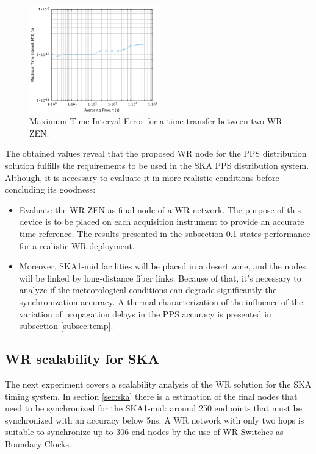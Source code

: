 \begin{figure}
		\centering
		\includegraphics[width=0.5\textwidth]{img/MTIE_exp1}
		\caption[MTIE plot for the WR-ZEN]{Maximum Time Interval Error for a 
		time transfer between two WR-ZEN.}
		\label{fig:mtie_exp1}

\end{figure}

The obtained values reveal that the proposed WR node for the PPS distribution 
solution fulfills the requirements to be used in the SKA PPS distribution 
system. Although, it is necessary to evaluate it in more realistic conditions 
before concluding its goodness:

\begin{itemize}
	\item Evaluate the WR-ZEN as final node of a WR network. The purpose of 
	this device is to be placed on each acquisition instrument to provide an 
	accurate time reference. The results presented in the subsection 
	\ref{subsec: net_exp} states performance for a realistic WR deployment.
	
	\item Moreover, SKA1-mid facilities will be placed in a desert zone, and 
	the nodes will be linked by long-distance fiber links. Because of that, 
	it's 
	necessary to analyze if the meteorological conditions can degrade 
	significantly the synchronization accuracy. A thermal characterization of 
	the influence of the variation of propagation delays in the PPS accuracy is 
	presented in subsection \ref{subsec:temp}.
\end{itemize}   

\subsection{WR scalability for SKA} %
\label{subsec: net_exp}

The next experiment covers a scalability analysis of the WR solution for the 
SKA timing system. In section \ref{sec:ska} there is a estimation of the final 
nodes that need to be synchronized for the SKA1-mid: around 250 endpoints that 
must be synchronized with an accuracy below 5ns. A WR network with only two 
hops is suitable to synchronize up to 306 end-nodes by the use of WR Switches as 
Boundary Clocks.

